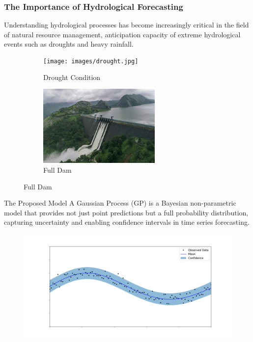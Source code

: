 \begin{frame}
	\frametitle{The Importance of Hydrological Forecasting}
	
	Understanding hydrological processes has become increasingly critical in the field of natural resource management, anticipation capacity of extreme hydrological events such as droughts and heavy rainfall.
	
	\begin{figure}
		\centering
		\begin{subfigure}[b]{0.45\textwidth}
			\centering
			\texttt{[image: images/drought.jpg]}
			\caption{Drought Condition}
		\end{subfigure}
		\hfill
		\begin{subfigure}[b]{0.45\textwidth}
			\centering
			\includegraphics[width=\textwidth, height=4cm]{images/full_dam.jpg}
			\caption{Full Dam}
		\end{subfigure}
	\end{figure}
	
\end{frame}

\begin{frame}{The Proposed Model}
	A Gaussian Process (GP) is a Bayesian non-parametric model that provides not just point predictions but a full probability distribution, capturing uncertainty and enabling confidence intervals in time series forecasting.
	
	\begin{figure}
		\centering
		\includegraphics[width=\textwidth]{images/gpr.png}
	\end{figure}
\end{frame}

